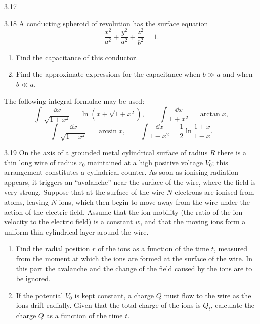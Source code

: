 \begin{figbox}{3.17}
\end{figbox}

\begin{problem}{3.18}
A conducting spheroid of revolution has the surface equation
\begin{equation*}
\frac{x^2}{a^2}+\frac{y^2}{a^2}+\frac{z^2}{b^2}=1.
\end{equation*}
\begin{enumerate}[label=(\arabic*),leftmargin=2.2em,itemsep=1pt,topsep=2pt]
\item Find the capacitance of this conductor.
\item Find the approximate expressions for the capacitance when $b\gg a$ and when $b\ll a$.
\end{enumerate}
The following integral formulae may be used:
\begin{equation*}
\int\frac{\dd x}{\sqrt{1+x^2}}=\ln\left(x+\sqrt{1+x^2}\right),\qquad
\int\frac{\dd x}{1+x^2}=\arctan x,
\end{equation*}
\begin{equation*}
\int\frac{\dd x}{\sqrt{1-x^2}}=\arcsin x,\qquad
\int\frac{\dd x}{1-x^2}=\frac{1}{2}\ln\frac{1+x}{1-x}.
\end{equation*}
\end{problem}

\begin{problem}{3.19}
On the axis of a grounded metal cylindrical surface of radius $R$ there is a thin long wire of radius $r_0$ maintained at a high positive voltage $V_0$; this arrangement constitutes a cylindrical counter. As soon as ionising radiation appears, it triggers an ``avalanche'' near the surface of the wire, where the field is very strong. Suppose that at the surface of the wire $N$ electrons are ionised from atoms, leaving $N$ ions, which then begin to move away from the wire under the action of the electric field. Assume that the ion mobility (the ratio of the ion velocity to the electric field) is a constant $w$, and that the moving ions form a uniform thin cylindrical layer around the wire.
\begin{enumerate}[label=(\arabic*),leftmargin=2.2em,itemsep=1pt,topsep=2pt]
\item Find the radial position $r$ of the ions as a function of the time $t$, measured from the moment at which the ions are formed at the surface of the wire. In this part the avalanche and the change of the field caused by the ions are to be ignored.
\item If the potential $V_0$ is kept constant, a charge $Q$ must flow to the wire as the ions drift radially. Given that the total charge of the ions is $Q_t$, calculate the charge $Q$ as a function of the time $t$.
\end{enumerate}
\end{problem}

